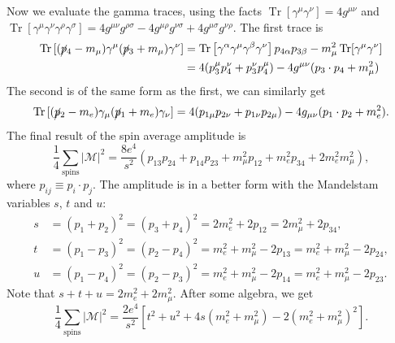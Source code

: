 \documentclass[aps,prb,superscriptaddress,nofootinbib]{revtex4}
\def \Tr{\operatorname{Tr}}
\begin{document}
Now we evaluate the gamma traces, using the facts $\Tr[\gamma^\mu \gamma^\nu]=4g^{\mu\nu}$ and $\Tr[\gamma^\mu \gamma^\nu \gamma^\rho \gamma^\sigma] = 4g^{\mu\nu}g^{\rho\sigma}-4g^{\mu\rho}g^{\nu\sigma}+4g^{\mu\sigma}g^{\nu\rho}$.
The first trace is
\begin{equation}
\begin{aligned}
	\Tr\left[(\cancel p_4 -m_\mu) \gamma^\mu (\cancel{p}_3 + m_\mu) \gamma^\nu \right]
	&= \Tr\left[\gamma^\alpha \gamma^\mu \gamma^\beta \gamma^\nu \right] p_{4\alpha} p_{3\beta} - m_\mu^2 \Tr[\gamma^\mu \gamma^\nu] \\
	&= 4 (p_3^\mu p_4^\nu + p_3^\nu p_4^\mu) - 4g^{\mu\nu}(p_3\cdot p_4 + m_\mu^2)
\end{aligned}
\end{equation}
The second is of the same form as the first, we can similarly get
\begin{equation}
	\Tr\left[(\cancel p_2-m_e) \gamma_\mu (\cancel p_1 +m_e) \gamma_\nu \right] 
	= 4 (p_{1\mu} p_{2\nu} + p_{1\nu} p_{2\mu}) - 4g_{\mu\nu}(p_1 \cdot p_2 + m_e^2).
\end{equation}
The final result of the spin average amplitude is
\begin{equation}
	\frac{1}{4}\sum_{\mathrm{spins}}|\mathcal M|^2 
	= \frac{8 e^{4}}{s^{2}}\left(p_{13} p_{24}+p_{14} p_{23}+m_{\mu}^{2} p_{12}+m_{e}^{2} p_{34}+2 m_{e}^{2} m_{\mu}^{2}\right),
\end{equation}
where $p_{ij}\equiv p_i \cdot p_j$.
The amplitude is in a better form with the Mandelstam variables $s$, $t$ and $u$:
\begin{equation}
\begin{aligned}
	s &=\left(p_{1}+p_{2}\right)^{2}=\left(p_{3}+p_{4}\right)^{2}=2 m_{e}^{2}+2 p_{12}=2 m_{\mu}^{2}+2 p_{34}, \\
	t &=\left(p_{1}-p_{3}\right)^{2}=\left(p_{2}-p_{4}\right)^{2}=m_{e}^{2}+m_{\mu}^{2}-2 p_{13}=m_{e}^{2}+m_{\mu}^{2}-2 p_{24}, \\
	u &=\left(p_{1}-p_{4}\right)^{2}=\left(p_{2}-p_{3}\right)^{2}=m_{e}^{2}+m_{\mu}^{2}-2 p_{14}=m_{e}^{2}+m_{\mu}^{2}-2 p_{23} .
\end{aligned}
\end{equation}
Note that $s+t+u = 2 m_e^2 + 2 m_\mu^2$. 
After some algebra, we get
\begin{equation}
	\frac{1}{4} \sum_{\mathrm{spins }}|\mathcal{M}|^{2}=\frac{2 e^{4}}{s^{2}}\left[t^{2}+u^{2}+4 s\left(m_{e}^{2}+m_{\mu}^{2}\right)-2\left(m_{e}^{2}+m_{\mu}^{2}\right)^{2}\right].
\end{equation}
\end{document}
